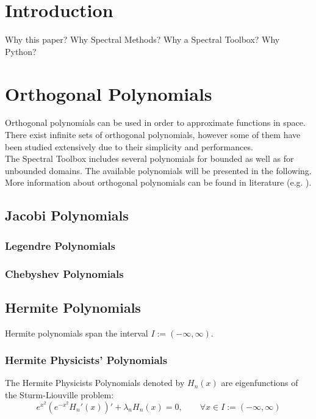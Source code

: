 \documentclass[a4paper,10pt]{article}
\begin{document}
\section{Introduction}
Why this paper?
Why Spectral Methods?
Why a Spectral Toolbox?
Why Python?

\section{Orthogonal Polynomials}
Orthogonal polynomials can be used in order to approximate functions in space. There exist infinite sets of orthogonal polynomials, however some of them have been studied extensively due to their simplicity and performances.\\

The Spectral Toolbox includes several polynomials for bounded as well as for unbounded domains. The available polynomials will be presented in the following. More information about orthogonal polynomials can be found in literature (e.g. \cite{shen_recent_2009}).

\subsection{Jacobi Polynomials}

\subsubsection{Legendre Polynomials}

\subsubsection{Chebyshev Polynomials}

\subsection{Hermite Polynomials}

Hermite polynomials span the interval $I:=(-\infty,\infty)$.

\subsubsection{Hermite Physicists' Polynomials}
The Hermite Physicists Polynomials denoted by $H_n(x)$ are eigenfunctions of the Sturm-Liouville problem:
\begin{equation}
e^{x^2}\left( e^{-x^2} H_n'(x) \right)' + \lambda_n H_n(x) = 0 , \qquad \forall x \in I:=(-\infty,\infty)
\end{equation}
\end{document}
